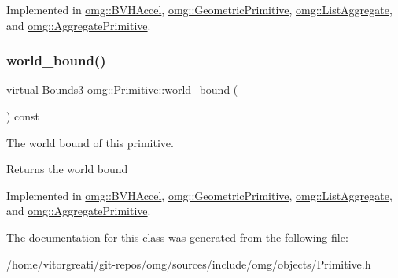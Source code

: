 Implemented in \mbox{\hyperlink{classomg_1_1_b_v_h_accel_a110cd424f8f4d628668cb500ff3c6e7a}{omg\+::\+B\+V\+H\+Accel}}, \mbox{\hyperlink{classomg_1_1_geometric_primitive_a797a2eb74fb48a7e25c7f98f16c604a7}{omg\+::\+Geometric\+Primitive}}, \mbox{\hyperlink{classomg_1_1_list_aggregate_ac3abd78ca5ce87eb3821bf19bf5194cf}{omg\+::\+List\+Aggregate}}, and \mbox{\hyperlink{classomg_1_1_aggregate_primitive_af6009e1c54b0f2341d78d95afb4268cc}{omg\+::\+Aggregate\+Primitive}}.

\mbox{\label{classomg_1_1_primitive_a457b29547bc918cf8874b24f5168ff86}} 
\subsubsection{\texorpdfstring{world\_bound()}{world\_bound()}}
{\footnotesize\ttfamily virtual \mbox{\hyperlink{classomg_1_1_bounds3}{Bounds3}} omg\+::\+Primitive\+::world\+\_\+bound (\begin{DoxyParamCaption}{ }\end{DoxyParamCaption}) const\hspace{0.3cm}{\ttfamily [pure virtual]}}



The world bound of this primitive. 

\begin{DoxyReturn}{Returns}
the world bound 
\end{DoxyReturn}


Implemented in \mbox{\hyperlink{classomg_1_1_b_v_h_accel_a8de5010cc4ddf9e0673461d711b9930b}{omg\+::\+B\+V\+H\+Accel}}, \mbox{\hyperlink{classomg_1_1_geometric_primitive_ae8f0945c180c43e32cad4faa75185522}{omg\+::\+Geometric\+Primitive}}, \mbox{\hyperlink{classomg_1_1_list_aggregate_a8c7b3a6c7c8a087355a1a35519c79555}{omg\+::\+List\+Aggregate}}, and \mbox{\hyperlink{classomg_1_1_aggregate_primitive_ad8a385aaa01354acffad18fe8f23fa25}{omg\+::\+Aggregate\+Primitive}}.



The documentation for this class was generated from the following file\+:\begin{DoxyCompactItemize}
\item 
/home/vitorgreati/git-\/repos/omg/sources/include/omg/objects/Primitive.\+h\end{DoxyCompactItemize}
